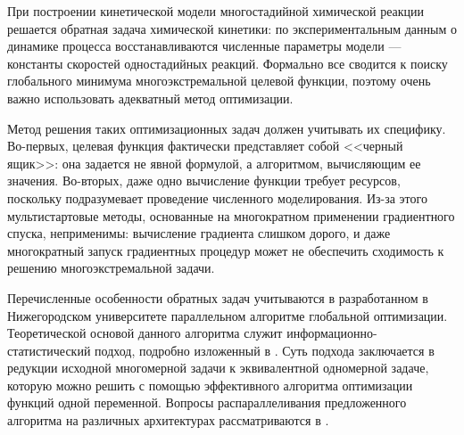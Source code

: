 \documentclass{cmi1}
\begin{document}
При построении кинетической модели многостадийной химической реакции решается обратная задача химической кинетики: по экспериментальным данным о динамике процесса восстанавливаются численные параметры модели --- константы скоростей одностадийных реакций. Формально все сводится к поиску глобального минимума многоэкстремальной целевой функции, поэтому очень важно использовать адекватный метод оптимизации.


Метод решения таких оптимизационных задач должен учитывать их специфику. Во-первых, целевая функция фактически представляет собой <<черный ящик>>: она задается не явной формулой, а алгоритмом, вычисляющим ее значения. Во-вторых, даже одно вычисление функции требует ресурсов, поскольку подразумевает проведение численного моделирования. Из-за этого мультистартовые методы, основанные на многократном применении градиентного спуска, неприменимы: вычисление градиента слишком дорого, и даже многократный запуск градиентных процедур может не обеспечить сходимость к решению многоэкстремальной задачи.

Перечисленные особенности обратных задач учитываются в разработанном в Нижегородском университете параллельном алгоритме глобальной оптимизации. Теоретической основой данного алгоритма служит информационно-статистический подход, подробно изложенный в . Суть подхода заключается в редукции исходной многомерной задачи к эквивалентной одномерной задаче, которую можно решить с помощью эффективного алгоритма оптимизации функций одной переменной. Вопросы распараллеливания предложенного алгоритма на различных архитектурах рассматриваются в .
\end{document}
